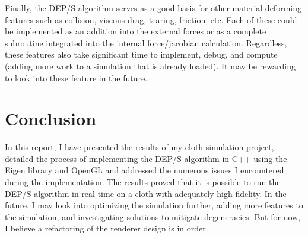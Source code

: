 \documentclass[letterpaper, 10 pt, conference]{ieeeconf}  %
\begin{document}
        Finally, the DEP/S algorithm serves as a good basis for other material deforming features such as collision, viscous drag, tearing, friction, etc. Each of these could be implemented as an addition into the external forces or as a complete subroutine integrated into the internal force/jacobian calculation. Regardless, these features also take significant time to implement, debug, and compute (adding more work to a simulation that is already loaded). It may be rewarding to look into these feature in the future.


\section{Conclusion}

        In this report, I have presented the results of my cloth simulation project, detailed the process of implementing the DEP/S algorithm in C++ using the Eigen library and OpenGL and addressed the numerous issues I encountered during the implementation. The results proved that it is possible to run the DEP/S algorithm in real-time on a cloth with adequately high fidelity. In the future, I may look into optimizing the simulation further, adding more features to the simulation, and investigating solutions to mitigate degeneracies. But for now, I believe a refactoring of the renderer design is in order.  



\addtolength{\textheight}{-12cm}   %





\end{document}
